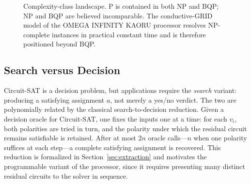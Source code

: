 \documentclass[letterpaper,journal]{IEEEtran}
\begin{document}
\begin{figure}[!t]
\centering
{}
\caption{Complexity-class landscape. P is contained in both NP and BQP;
NP and BQP are believed incomparable. The conductive-GRID model of the
OMEGA INFINITY KAORU processor resolves NP-complete instances in practical
constant time and is therefore positioned beyond BQP.}
\label{fig:classes}
\end{figure}
\subsection{Search versus Decision}
\label{sec:searchdecision}
Circuit-SAT is a decision problem, but applications require the
\emph{search} variant: producing a satisfying assignment $a$, not merely a
yes/no verdict. The two are polynomially related by the classical
search-to-decision reduction. Given a decision oracle for Circuit-SAT, one
fixes the inputs one at a time: for each $v_i$, both polarities are tried in
turn, and the polarity under which the residual circuit remains satisfiable
is retained. After at most $2n$ oracle calls---$n$ when one polarity
suffices at each step---a complete satisfying assignment is recovered. This
reduction is formalized in Section~\ref{sec:extraction} and motivates the
programmable variant of the processor, since it requires presenting many
distinct residual circuits to the solver in sequence.
\end{document}
